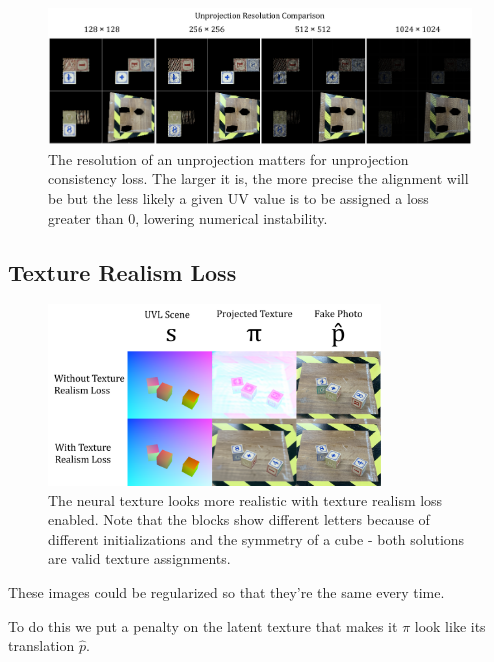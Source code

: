 \documentclass{article}
\begin{document}
\begin{figure}[H]
	\begin{center}
		\includegraphics[width=400pt]{../images/unprojection_resolution_comparison.pdf}
	\end{center}
	\caption{
		The resolution of an unprojection matters for unprojection consistency loss. The larger it is, the more precise the alignment will be but the less likely a given UV value is to be assigned a loss greater than 0, lowering numerical instability.
	}
	\label{fig:unprojection_resolution_comparison}
\end{figure}

\subsection{Texture Realism Loss}
\label{sec:texture_realism_loss}

\begin{figure}[H]
	\begin{center}
		\includegraphics[width=250pt]{../images/texture_realism_ablation.pdf}
	\end{center}
	\caption{
		The neural texture looks more realistic with texture realism loss enabled. Note that the blocks show different letters because of different initializations and the symmetry of a cube - both solutions are valid texture assignments. 
	}
	\label{fig:texture_realism_ablation}
\end{figure}

These images could be regularized so that they're the same every time.

To do this we put a penalty on the latent texture that makes it $\pi$ look like its translation $\hat{p}$. 
\end{document}
